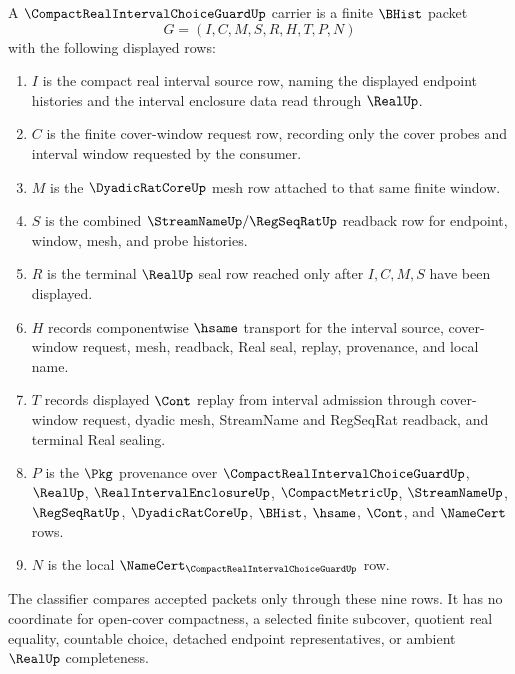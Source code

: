 \begin{definition}
\label{def:compact-real-interval-choice-guard-carrier}
A $\CompactRealIntervalChoiceGuardUp$ carrier is a finite $\BHist$ packet
$$
G=(I,C,M,S,R,H,T,P,N)
$$
with the following displayed rows:
\begin{enumerate}
\item $I$ is the compact real interval source row, naming the displayed endpoint histories and the interval enclosure data read through $\RealUp$.
\item $C$ is the finite cover-window request row, recording only the cover probes and interval window requested by the consumer.
\item $M$ is the $\DyadicRatCoreUp$ mesh row attached to that same finite window.
\item $S$ is the combined $\StreamNameUp/\RegSeqRatUp$ readback row for endpoint, window, mesh, and probe histories.
\item $R$ is the terminal $\RealUp$ seal row reached only after $I,C,M,S$ have been displayed.
\item $H$ records componentwise $\hsame$ transport for the interval source, cover-window request, mesh, readback, Real seal, replay, provenance, and local name.
\item $T$ records displayed $\Cont$ replay from interval admission through cover-window request, dyadic mesh, StreamName and RegSeqRat readback, and terminal Real sealing.
\item $P$ is the $\Pkg$ provenance over $\CompactRealIntervalChoiceGuardUp$, $\RealUp$, $\RealIntervalEnclosureUp$, $\CompactMetricUp$, $\StreamNameUp$, $\RegSeqRatUp$, $\DyadicRatCoreUp$, $\BHist$, $\hsame$, $\Cont$, and $\NameCert$ rows.
\item $N$ is the local $\NameCert_{\CompactRealIntervalChoiceGuardUp}$ row.
\end{enumerate}
The classifier compares accepted packets only through these nine rows. It has no coordinate for open-cover compactness, a selected finite subcover, quotient real equality, countable choice, detached endpoint representatives, or ambient $\RealUp$ completeness.
\end{definition}

